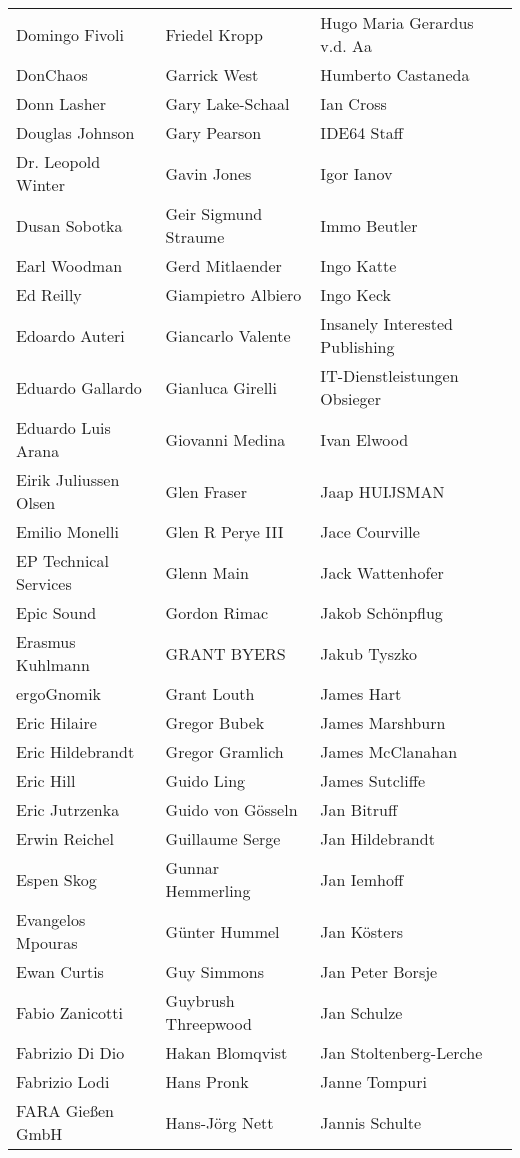\begin{small}
\begin{tabular}{p{4cm}p{4cm}p{4cm}}
Domingo Fivoli & Friedel Kropp & Hugo Maria Gerardus v.d. Aa \\
DonChaos & Garrick West & Humberto Castaneda \\
Donn Lasher & Gary Lake-Schaal & Ian Cross \\
Douglas Johnson & Gary Pearson & IDE64 Staff \\
Dr. Leopold Winter & Gavin Jones & Igor Ianov \\
Dusan Sobotka & Geir Sigmund Straume & Immo Beutler \\
Earl Woodman & Gerd Mitlaender & Ingo Katte \\
Ed Reilly & Giampietro Albiero & Ingo Keck \\
Edoardo Auteri & Giancarlo Valente & Insanely Interested Publishing \\
Eduardo Gallardo & Gianluca Girelli & IT-Dienstleistungen Obsieger \\
Eduardo Luis Arana & Giovanni Medina & Ivan Elwood \\
Eirik Juliussen Olsen & Glen Fraser & Jaap HUIJSMAN \\
Emilio Monelli & Glen R Perye III & Jace Courville \\
EP Technical Services & Glenn Main & Jack Wattenhofer \\
Epic Sound & Gordon Rimac & Jakob Schönpflug \\
Erasmus Kuhlmann & GRANT BYERS & Jakub Tyszko \\
ergoGnomik & Grant Louth & James Hart \\
Eric Hilaire & Gregor Bubek & James Marshburn \\
Eric Hildebrandt & Gregor Gramlich & James McClanahan \\
Eric Hill & Guido Ling & James Sutcliffe \\
Eric Jutrzenka & Guido von Gösseln & Jan Bitruff \\
Erwin Reichel & Guillaume Serge & Jan Hildebrandt \\
Espen Skog & Gunnar Hemmerling & Jan Iemhoff \\
Evangelos Mpouras & Günter Hummel & Jan Kösters \\
Ewan Curtis & Guy Simmons & Jan Peter Borsje \\
Fabio Zanicotti & Guybrush Threepwood & Jan Schulze \\
Fabrizio Di Dio & Hakan Blomqvist & Jan Stoltenberg-Lerche \\
Fabrizio Lodi & Hans Pronk & Janne Tompuri \\
FARA Gießen GmbH & Hans-Jörg Nett & Jannis Schulte \\

\end{tabular}
\end{small}
